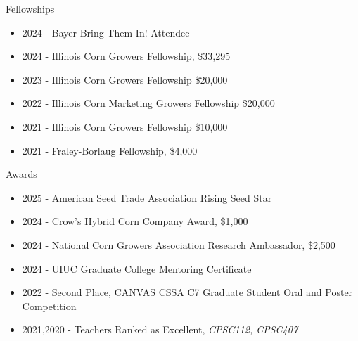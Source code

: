 \entry{}
    {Fellowships}
    {}
    {}
\noindent 
    \begin{itemize}
        \item 2024 - Bayer Bring Them In! Attendee
        \item 2024 - Illinois Corn Growers Fellowship, \$33,295
        \item 2023 - Illinois Corn Growers Fellowship \$20,000
        \item 2022 - Illinois Corn Marketing Growers Fellowship \$20,000
        \item 2021 - Illinois Corn Growers Fellowship \$10,000
        \item 2021 - Fraley-Borlaug Fellowship, \$4,000
    \end{itemize}

\entry{}
    {Awards}
    {}
    {}
\noindent
    \begin{itemize}
        \item 2025 - American Seed Trade Association Rising Seed Star
        \item 2024 - Crow's Hybrid Corn Company Award, \$1,000
        \item 2024 - National Corn Growers Association Research Ambassador, \$2,500
        \item 2024 - UIUC Graduate College Mentoring Certificate
        \item 2022 - Second Place, CANVAS CSSA C7 Graduate Student Oral and Poster Competition
        \item 2021,2020 - Teachers Ranked as Excellent, \textit{CPSC112, CPSC407}
    \end{itemize}

